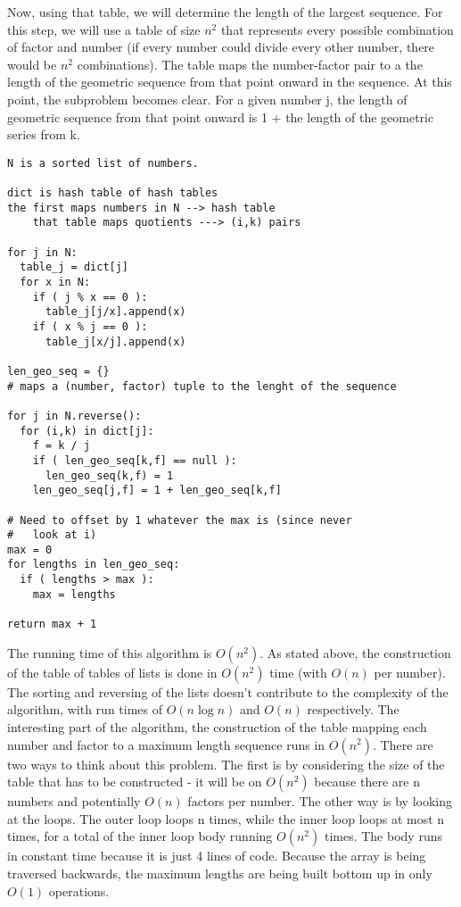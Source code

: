 \documentclass[12pt,twoside]{article}
\begin{document}
\begin{problems}
\begin{problemparts}
Now, using that table, we will determine the length of the largest sequence.  For this step, we will use a table of size $n^2$ that represents every possible combination of factor and number (if every number could divide every other number, there would be $n^2$ combinations).  The table maps the number-factor pair to a the length of the geometric sequence from that point onward in the sequence.  At this point, the subproblem becomes clear.  For a given number j, the length of geometric sequence from that point onward is 1 + the length of the geometric series from k.\\

\begin{lstlisting}
N is a sorted list of numbers.

dict is hash table of hash tables
the first maps numbers in N --> hash table
	that table maps quotients ---> (i,k) pairs

for j in N:
  table_j = dict[j]
  for x in N:
    if ( j % x == 0 ):
      table_j[j/x].append(x)
    if ( x % j == 0 ):
      table_j[x/j].append(x)

len_geo_seq = {}
# maps a (number, factor) tuple to the lenght of the sequence
  
for j in N.reverse():
  for (i,k) in dict[j]:
    f = k / j
    if ( len_geo_seq[k,f] == null ):
      len_geo_seq(k,f) = 1
    len_geo_seq[j,f] = 1 + len_geo_seq[k,f] 

# Need to offset by 1 whatever the max is (since never
#	look at i)
max = 0
for lengths in len_geo_seq:
  if ( lengths > max ):
    max = lengths

return max + 1

\end{lstlisting}
The running time of this algorithm is $O(n^2)$.  As stated above, the construction of the table of tables of lists is done in $O(n^2)$ time (with $O(n)$ per number).  The sorting and reversing of the lists doesn't contribute to the complexity of the algorithm, with run times of $O(n \log n)$ and $O(n)$ respectively.  The interesting part of the algorithm, the construction of the table mapping each number and factor to a maximum length sequence runs in $O(n^2)$.  There are two ways to think about this problem.  The first is by considering the size of the table that has to be constructed - it will be on $O(n^2)$ because there are n numbers and potentially $O(n)$ factors per number.  The other way is by looking at the loops. The outer loop loops n times, while the inner loop loops at most n times, for a total of the inner loop body running $O(n^2)$ times.  The body runs in constant time because it is just 4 lines of code.  Because the array is being traversed backwards, the maximum lengths are being built bottom up in only $O(1)$ operations.\\


\end{problemparts}
\end{problems}
\end{document}
